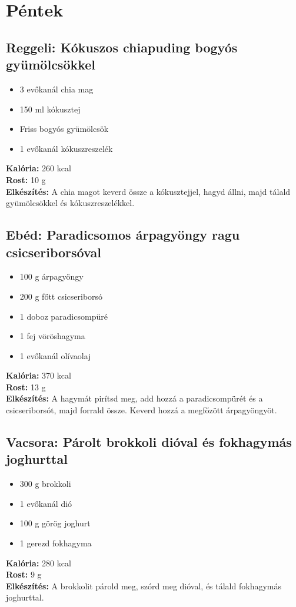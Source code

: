 \newpage

\section{Péntek}
\sordisz
\subsection{Reggeli: Kókuszos chiapuding bogyós gyümölcsökkel}
\begin{itemize}
    \item 3 evőkanál chia mag
    \item 150 ml kókusztej
    \item Friss bogyós gyümölcsök
    \item 1 evőkanál kókuszreszelék
\end{itemize}
\textbf{Kalória:} 260 kcal \\
\textbf{Rost:} 10 g \\
\textbf{Elkészítés:} A chia magot keverd össze a kókusztejjel, hagyd állni, majd tálald gyümölcsökkel és kókuszreszelékkel.

\sordisz
\subsection{Ebéd: Paradicsomos árpagyöngy ragu csicseriborsóval}
\begin{itemize}
    \item 100 g árpagyöngy
    \item 200 g főtt csicseriborsó
    \item 1 doboz paradicsompüré
    \item 1 fej vöröshagyma
    \item 1 evőkanál olívaolaj
\end{itemize}
\textbf{Kalória:} 370 kcal \\
\textbf{Rost:} 13 g \\
\textbf{Elkészítés:} A hagymát pirítsd meg, add hozzá a paradicsompürét és a csicseriborsót, majd forrald össze. Keverd hozzá a megfőzött árpagyöngyöt.

\sordisz
\subsection{Vacsora: Párolt brokkoli dióval és fokhagymás joghurttal}
\begin{itemize}
    \item 300 g brokkoli
    \item 1 evőkanál dió
    \item 100 g görög joghurt
    \item 1 gerezd fokhagyma
\end{itemize}
\textbf{Kalória:} 280 kcal \\
\textbf{Rost:} 9 g \\
\textbf{Elkészítés:} A brokkolit párold meg, szórd meg dióval, és tálald fokhagymás joghurttal.

